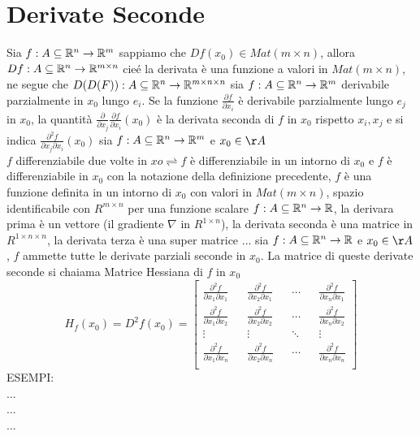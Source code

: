 \section{Derivate Seconde}
Sia $f:A\subseteq \mathbb{R}^n \rightarrow \mathbb{R}^m$ sappiamo che $Df(x_0)\in Mat(m\times n)$, allora $Df:A\subseteq \mathbb{R}^{n} \rightarrow \mathbb{R}^{m\times n}$ cie\'e la derivata è una funzione a valori in $Mat(m\times n)$, ne segue che $D(D(F)):A\subseteq \mathbb{R}^n \rightarrow \mathbb{R}^{m\times n\times n}$
sia $f:A\subseteq \mathbb{R}^n \rightarrow \mathbb{R}^m$ derivabile parzialmente in $x_0$ lungo $e_i$. Se la funzione $\frac{\partial{f}}{\partial{x_i}}$ è derivabile parzialmente lungo $e_j$ in $x_0$, la quantità $\frac{\partial}{\partial{x_j}}\frac{\partial{f}}{\partial{x_i}}(x_0)$ è la derivata seconda di $f$ in $x_0$ rispetto $x_i,x_j$ e si indica $\frac{\partial^2f}{\partial{x_j}\partial{x_i}}(x_0)$
sia $f:A\subseteq \mathbb{R}^n \rightarrow \mathbb{R}^m$ e $x_0\in\AA$\\
$f$ differenziabile due volte in $xo \rightleftharpoons f$ è differenziabile in un intorno di $x_0$ e $f$ è differenziabile in $x_0$
\observation
con la notazione della definizione precedente, $f$ è una funzione definita in un intorno di $x_0$ con valori in $Mat(m\times n)$, spazio identificabile con $R^{m\times n}$
\observation
per una funzione scalare $f:A\subseteq \mathbb{R}^n \rightarrow \mathbb{R}$, la derivara prima è un vettore (il gradiente $\nabla$ in $R^{1\times n}$), la derivata seconda è una matrice in $R^{1\times n \times n}$, la derivata terza è una super matrice ...
sia $f:A\subseteq \mathbb{R}^n \rightarrow \mathbb{R}$ e $x_0\in\AA$, $f$ ammette tutte le derivate parziali seconde in $x_0$. La matrice di queste derivate seconde si chaiama Matrice Hessiana di $f$ in $x_0$
$$H_f(x_0)=D^2f(x_0) = \begin{bmatrix}
\frac{\partial^2f}{\partial{x_1}\partial{x_1}} && \frac{\partial^2f}{\partial{x_2}\partial{x_1}} && \dotsb && \frac{\partial^2f}{\partial{x_n}\partial{x_1}} \\
\frac{\partial^2f}{\partial{x_1}\partial{x_2}} && \frac{\partial^2f}{\partial{x_2}\partial{x_2}} && \dotsb && \frac{\partial^2f}{\partial{x_n}\partial{x_2}} \\
\vdots && \vdots && \ddots && \vdots \\
\frac{\partial^2f}{\partial{x_1}\partial{x_n}} && \frac{\partial^2f}{\partial{x_2}\partial{x_n}} && \dotsb && \frac{\partial^2f}{\partial{x_n}\partial{x_n}} \\
\end{bmatrix}$$ 
ESEMPI:\\
...\\
...\\
...\\

